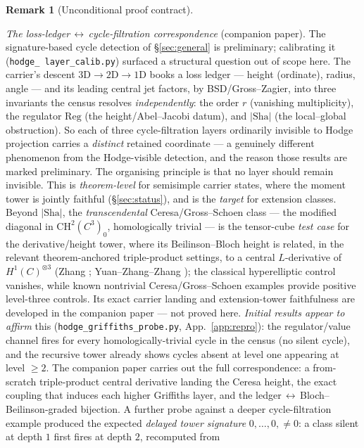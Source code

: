 \documentclass[11pt]{article}
\newcommand{\bullshit}[1]{%
  \samwarning{MODEL-CONTAMINATION: #1}%
}
\theoremstyle{definition}
\newtheorem{remark}[theorem]{Remark}
\newcommand{\Sha}{\mathrm{Sha}}
\begin{document}
\begin{remark}[Unconditional proof contract]
\begin{enumerate}
\emph{The loss-ledger$\,\leftrightarrow\,$cycle-filtration correspondence} \bullshit{scrambling} (companion paper). The
signature-based cycle detection of \S\ref{sec:general} is preliminary; calibrating it (\texttt{hodge\_%
layer\_calib.py}) surfaced a structural question out of scope here. The carrier's descent
$3\mathrm D\!\to\!2\mathrm D\!\to\!1\mathrm D$ books a loss ledger --- height (ordinate), radius, angle ---
and its leading central jet factors, by BSD/Gross--Zagier, into three invariants the census resolves
\emph{independently}: the order $r$ (vanishing multiplicity), the regulator $\mathrm{Reg}$ (the
height/Abel--Jacobi datum), and $|\Sha|$ (the local--global obstruction). So each of three
cycle-filtration layers ordinarily invisible to Hodge projection carries a \emph{distinct} retained
coordinate --- a genuinely different phenomenon from the Hodge-visible detection, and the reason those
results are marked preliminary. The organising principle is that no layer should remain
invisible. This is \emph{theorem-level} for semisimple carrier states, where the moment tower is jointly
faithful (\S\ref{sec:status}), and is the \emph{target} for extension classes. Beyond $|\Sha|$, the
\emph{transcendental} Ceresa/Gross--Schoen class --- the modified diagonal in $\mathrm{CH}^2(C^3)_0$,
homologically trivial --- is the tensor-cube \emph{test case} for the derivative/height tower, where its
Beilinson--Bloch height is related, in the relevant theorem-anchored triple-product settings, to a central
$L$-derivative of $H^1(C)^{\otimes3}$ (Zhang \cite{ZhangGS}; Yuan--Zhang--Zhang \cite{YZZ}); the classical
hyperelliptic control vanishes, while known nontrivial Ceresa/Gross--Schoen examples provide positive
level-three controls. Its exact carrier landing and extension-tower faithfulness are developed in the
companion paper --- not proved here. \emph{Initial results appear to affirm} this
(\texttt{hodge\_griffiths\_probe.py}, App.~\ref{app:repro}): the regulator/value channel fires for every
homologically-trivial cycle in the census (no silent cycle), and the recursive tower already shows cycles
absent at level one appearing at level $\ge2$. The companion paper carries out the full correspondence: a
from-scratch triple-product central derivative landing the Ceresa height, the exact coupling that induces
each higher Griffiths layer, and the ledger$\,\leftrightarrow\,$Bloch--Beilinson-graded bijection. A
further probe against a deeper cycle-filtration example produced the expected \emph{delayed tower
signature} $0,\dots,0,\neq0$: a class silent at depth $1$ first fires at depth $2$, recomputed from

\end{enumerate}
\end{remark}
\end{document}
